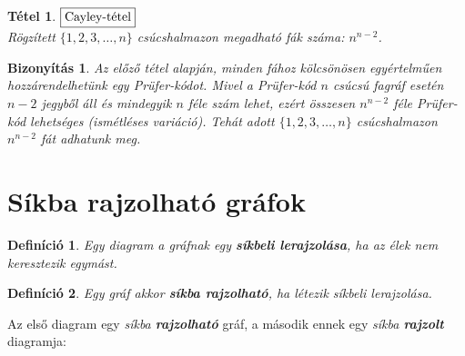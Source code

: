 \documentclass[a4paper,12pt,twoside]{book}
\newtheorem{defi}{Definíció}[chapter]
\newtheorem{tetel}{Tétel}[chapter]
\newtheorem{biz}{Bizonyítás}[chapter]
\theoremstyle{break}
\begin{document}
\begin{tetel} $\boxed{$Cayley-tétel$}$\\
 Rögzített $\{1,2,3,\ldots,n\}$ csúcshalmazon megadható fák száma: $n^{n-2}$.
\end{tetel}
\begin{biz}
 Az előző tétel alapján, minden fához kölcsönösen egyértelműen hozzárendelhetünk egy \textit{Prüfer-kód}ot. Mivel a Prüfer-kód $n$ csúcsú fagráf esetén $n-2$ jegyből áll és mindegyik $n$ féle szám lehet, ezért összesen $n^{n-2}$ féle \textit{Prüfer-kód} lehetséges (ismétléses variáció). Tehát adott $\{1,2,3,\ldots,n\}$ csúcshalmazon $n^{n-2}$ fát adhatunk meg.
\end{biz}

\section{Síkba rajzolható gráfok}

\begin{defi}
 Egy diagram a gráfnak egy \textbf{síkbeli lerajzolása}, ha az élek nem keresztezik egymást.
\end{defi}

\begin{defi}
 Egy gráf akkor \textbf{síkba rajzolható}, ha létezik \textit{síkbeli lerajzolása}.
\end{defi}

Az első diagram egy \textit{síkba \textbf{rajzolható}} gráf, a második ennek egy \textit{síkba \textbf{rajzolt}} diagramja:
\begin{center}
\vspace*{-20pt}
\end{center}
\end{document}
